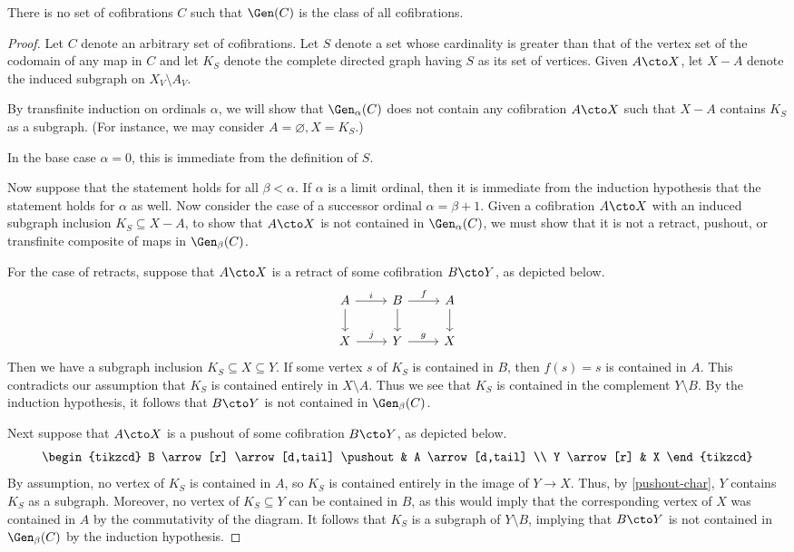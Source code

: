 \begin{proposition}\label{no-gen-cof-set}
There is no set of cofibrations $C$ such that $\Gen(C)$ is the class of all cofibrations.
\end{proposition}

\begin{proof}
Let $C$ denote an arbitrary set of cofibrations. Let  $S$ denote a set whose cardinality is greater than that of the vertex set of the codomain of any map in $C$ and let $K_S$ denote the complete directed graph having $S$ as its set of vertices. Given $A \cto X$, let $X - A$ denote the induced subgraph on $X_V\setminus A_V.$

By transfinite induction on ordinals $\alpha$, we will show that $\Gen_\alpha(C)$ does not contain any cofibration $A \cto X$ such that $X - A$ contains $K_S$ as a subgraph. (For instance, we may consider $A = \varnothing, X = K_S$.) 

In the base case $\alpha = 0$, this is immediate from the definition of $S$.

Now suppose that the statement holds for all $\beta < \alpha$. If $\alpha$ is a limit ordinal, then it is immediate from the induction hypothesis that the statement holds for $\alpha$ as well. Now consider the case of a successor ordinal $\alpha = \beta + 1$. Given a cofibration $A \cto X$ with an induced subgraph inclusion $K_S \subseteq X-A$, to show that $A \cto X$ is not contained in $\Gen_\alpha(C)$, we must show that it is not a retract, pushout, or transfinite composite of maps in $\Gen_\beta(C)$.

For the case of retracts, suppose that $A \cto X$ is a retract of some cofibration $B \cto Y$, as depicted below.
\[
\begin{tikzcd}
A \arrow[d] \arrow[r,"i",above] & B \arrow[d] \arrow[r,"f",above] & A \arrow[d] \\
X \arrow[r,"j",above] & Y \arrow[r,"g",above] & X
\end{tikzcd}
\]
Then we have a subgraph inclusion $K_S \subseteq X \subseteq Y$. If some vertex $s$ of $K_S$ is contained in $B$, then $f(s) = s$ is contained in $A$. This contradicts our assumption that $K_S$ is contained entirely in $X \setminus A$. Thus we see that $K_S$ is contained in the complement $Y \setminus B$. By the induction hypothesis, it follows that $B \cto Y$ is not contained in $\Gen_\beta(C)$.

Next suppose that $A \cto X$ is a pushout of some cofibration $B \cto Y$, as depicted below.
\[
\begin{tikzcd}
B \arrow[r] \arrow[d,tail] \pushout & A \arrow[d,tail] \\
Y \arrow[r] & X
\end{tikzcd}
\]
By assumption, no vertex of $K_S$ is contained in $A$, so $K_S$ is contained entirely in the image of $Y \to X$. Thus, by \cref{pushout-char}, $Y$ contains $K_S$ as a subgraph. Moreover, no vertex of $K_S \subseteq Y$ can be contained in $B$, as this would imply that the corresponding vertex of $X$ was contained in $A$ by the commutativity of the diagram. It follows that $K_S$ is a subgraph of $Y \setminus B$, implying that $B \cto Y$ is not contained in $\Gen_\beta(C)$ by the induction hypothesis.


\end{proof}
